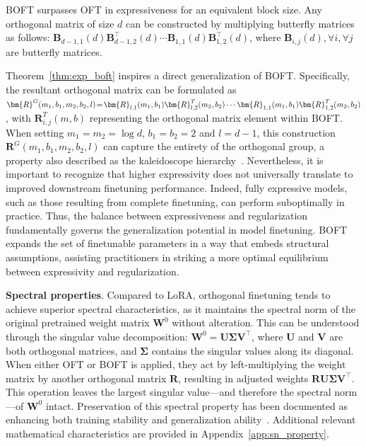 \begin{theorem}\label{thm:exp_boft}
    BOFT surpasses OFT in expressiveness for an equivalent block size. Any orthogonal matrix of size $d$ can be constructed by multiplying butterfly matrices as follows: $\bm{B}_{d-1,1}(d)\bm{B}^\top_{d-1,2}(d)\cdots\bm{B}_{1,1}(d)\bm{B}^\top_{1,2}(d)$, where $\bm{B}_{i,j}(d),\forall i,\forall j$ are butterfly matrices.
\end{theorem}

Theorem~\ref{thm:exp_boft} inspires a direct generalization of BOFT. Specifically, the resultant orthogonal matrix can be formulated as $\thickmuskip=2mu \medmuskip=2mu \bm{R}^G(m_1,b_1,m_2,b_2,l)=\bm{R}_{l,1}(m_1,b_1)\bm{R}_{l,2}^T(m_2,b_2)\cdots\bm{R}_{1,1}(m_1,b_1)\bm{R}_{1,2}^T(m_2,b_2)$, with $\bm{R}_{i,j}^T(m,b)$ representing the orthogonal matrix element within BOFT. When setting $m_1=m_2=\log d$, $b_1=b_2=2$ and $l=d-1$, this construction $\bm{R}^G(m_1,b_1,m_2,b_2,l)$ can capture the entirety of the orthogonal group, a property also described as the kaleidoscope hierarchy~\cite{dao2019kaleidoscope}. Nevertheless, it is important to recognize that higher expressivity does not universally translate to improved downstream finetuning performance. Indeed, fully expressive models, such as those resulting from complete finetuning, can perform suboptimally in practice. Thus, the balance between expressiveness and regularization fundamentally governs the generalization potential in model finetuning. BOFT expands the set of finetunable parameters in a way that embeds structural assumptions, assisting practitioners in striking a more optimal equilibrium between expressivity and regularization.

\textbf{Spectral properties}. Compared to LoRA, orthogonal finetuning tends to achieve superior spectral characteristics, as it maintains the spectral norm of the original pretrained weight matrix $\bm{W}^0$ without alteration. This can be understood through the singular value decomposition: $\bm{W}^0=\bm{U}\bm{\Sigma}\bm{V}^\top$, where $\bm{U}$ and $\bm{V}$ are both orthogonal matrices, and $\bm{\Sigma}$ contains the singular values along its diagonal. When either OFT or BOFT is applied, they act by left-multiplying the weight matrix by another orthogonal matrix $\bm{R}$, resulting in adjusted weights $\bm{R}\bm{U}\bm{\Sigma}\bm{V}^\top$. This operation leaves the largest singular value—and therefore the spectral norm—of $\bm{W}^0$ intact. Preservation of this spectral property has been documented as enhancing both training stability and generalization ability~\cite{miyato2018spectral,yoshida2017spectral}. Additional relevant mathematical characteristics are provided in Appendix~\ref{app:sn_property}.

